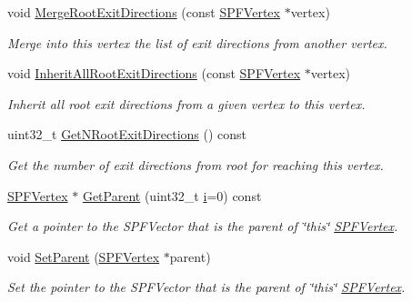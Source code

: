 \begin{DoxyCompactItemize}
void \hyperlink{classns3_1_1SPFVertex_a4fc3b7cdcd705457993f644046e89318}{Merge\+Root\+Exit\+Directions} (const \hyperlink{classns3_1_1SPFVertex}{S\+P\+F\+Vertex} $\ast$vertex)
\begin{DoxyCompactList}\small\item\em Merge into \textquotesingle{}this\textquotesingle{} vertex the list of exit directions from another vertex. \end{DoxyCompactList}\item 
void \hyperlink{classns3_1_1SPFVertex_a3031d94106d3ce70776b2fe9a73ae36c}{Inherit\+All\+Root\+Exit\+Directions} (const \hyperlink{classns3_1_1SPFVertex}{S\+P\+F\+Vertex} $\ast$vertex)
\begin{DoxyCompactList}\small\item\em Inherit all root exit directions from a given vertex to \textquotesingle{}this\textquotesingle{} vertex. \end{DoxyCompactList}\item 
uint32\+\_\+t \hyperlink{classns3_1_1SPFVertex_ad3466159b6810950cb4d202cc398ef12}{Get\+N\+Root\+Exit\+Directions} () const 
\begin{DoxyCompactList}\small\item\em Get the number of exit directions from root for reaching \textquotesingle{}this\textquotesingle{} vertex. \end{DoxyCompactList}\item 
\hyperlink{classns3_1_1SPFVertex}{S\+P\+F\+Vertex} $\ast$ \hyperlink{classns3_1_1SPFVertex_af09dba1ce31eff535d0bc661ce18bba5}{Get\+Parent} (uint32\+\_\+t \hyperlink{lte__uplink__power__control_8m_a6f6ccfcf58b31cb6412107d9d5281426}{i}=0) const 
\begin{DoxyCompactList}\small\item\em Get a pointer to the S\+P\+F\+Vector that is the parent of \char`\"{}this\char`\"{} \hyperlink{classns3_1_1SPFVertex}{S\+P\+F\+Vertex}. \end{DoxyCompactList}\item 
void \hyperlink{classns3_1_1SPFVertex_a4f8e0fed65db9fe485dae7ad9667ff40}{Set\+Parent} (\hyperlink{classns3_1_1SPFVertex}{S\+P\+F\+Vertex} $\ast$parent)
\begin{DoxyCompactList}\small\item\em Set the pointer to the S\+P\+F\+Vector that is the parent of \char`\"{}this\char`\"{} \hyperlink{classns3_1_1SPFVertex}{S\+P\+F\+Vertex}. \end{DoxyCompactList}\item 

\end{DoxyCompactItemize}
